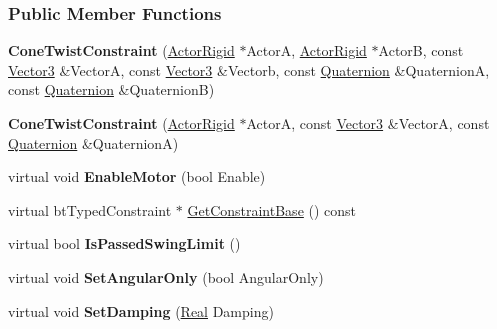 \subsubsection*{Public Member Functions}
\begin{DoxyCompactItemize}
\item 
\hypertarget{classMezzanine_1_1ConeTwistConstraint_ade6711300f4f4622f49752cfcbf81494}{
{\bfseries ConeTwistConstraint} (\hyperlink{classMezzanine_1_1ActorRigid}{ActorRigid} $\ast$ActorA, \hyperlink{classMezzanine_1_1ActorRigid}{ActorRigid} $\ast$ActorB, const \hyperlink{classMezzanine_1_1Vector3}{Vector3} \&VectorA, const \hyperlink{classMezzanine_1_1Vector3}{Vector3} \&Vectorb, const \hyperlink{classMezzanine_1_1Quaternion}{Quaternion} \&QuaternionA, const \hyperlink{classMezzanine_1_1Quaternion}{Quaternion} \&QuaternionB)}
\label{classMezzanine_1_1ConeTwistConstraint_ade6711300f4f4622f49752cfcbf81494}

\item 
\hypertarget{classMezzanine_1_1ConeTwistConstraint_ac875c5b0481a945f314bd3ea54c872f8}{
{\bfseries ConeTwistConstraint} (\hyperlink{classMezzanine_1_1ActorRigid}{ActorRigid} $\ast$ActorA, const \hyperlink{classMezzanine_1_1Vector3}{Vector3} \&VectorA, const \hyperlink{classMezzanine_1_1Quaternion}{Quaternion} \&QuaternionA)}
\label{classMezzanine_1_1ConeTwistConstraint_ac875c5b0481a945f314bd3ea54c872f8}

\item 
\hypertarget{classMezzanine_1_1ConeTwistConstraint_a83208911e81d36201375e6a9f8b21d1d}{
virtual void {\bfseries EnableMotor} (bool Enable)}
\label{classMezzanine_1_1ConeTwistConstraint_a83208911e81d36201375e6a9f8b21d1d}

\item 
virtual btTypedConstraint $\ast$ \hyperlink{classMezzanine_1_1ConeTwistConstraint_a4b478db86131128394899dca6c2191aa}{GetConstraintBase} () const 
\item 
\hypertarget{classMezzanine_1_1ConeTwistConstraint_a62d162e8083c50e5b74219de6578d2ea}{
virtual bool {\bfseries IsPassedSwingLimit} ()}
\label{classMezzanine_1_1ConeTwistConstraint_a62d162e8083c50e5b74219de6578d2ea}

\item 
\hypertarget{classMezzanine_1_1ConeTwistConstraint_ac62fe78e15e9aba7970f0101c1e77a66}{
virtual void {\bfseries SetAngularOnly} (bool AngularOnly)}
\label{classMezzanine_1_1ConeTwistConstraint_ac62fe78e15e9aba7970f0101c1e77a66}

\item 
\hypertarget{classMezzanine_1_1ConeTwistConstraint_ae658cd9f534edb059f71207ebbfc4d5e}{
virtual void {\bfseries SetDamping} (\hyperlink{namespaceMezzanine_a726731b1a7df72bf3583e4a97282c6f6}{Real} Damping)}
\label{classMezzanine_1_1ConeTwistConstraint_ae658cd9f534edb059f71207ebbfc4d5e}


\end{DoxyCompactItemize}
